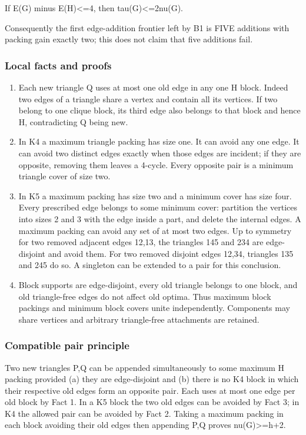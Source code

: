 \documentclass[11pt]{article}
\begin{document}
If \textbar E(G) minus E(H)\textbar\textless=4, then tau(G)\textless=2nu(G).

Consequently the first edge-addition frontier left by B1 is FIVE additions with packing gain exactly two; this does not claim that five additions fail.

\subsubsection{Local facts and proofs}\label{local-facts-and-proofs}

\begin{enumerate}
\def\labelenumi{\arabic{enumi}.}
\item
  Each new triangle Q uses at most one old edge in any one H block. Indeed two edges of a triangle share a vertex and contain all its vertices. If two belong to one clique block, its third edge also belongs to that block and hence H, contradicting Q being new.
\item
  In K4 a maximum triangle packing has size one. It can avoid any one edge. It can avoid two distinct edges exactly when those edges are incident; if they are opposite, removing them leaves a 4-cycle. Every opposite pair is a minimum triangle cover of size two.
\item
  In K5 a maximum packing has size two and a minimum cover has size four. Every prescribed edge belongs to some minimum cover: partition the vertices into sizes 2 and 3 with the edge inside a part, and delete the internal edges. A maximum packing can avoid any set of at most two edges. Up to symmetry for two removed adjacent edges 12,13, the triangles 145 and 234 are edge-disjoint and avoid them. For two removed disjoint edges 12,34, triangles 135 and 245 do so. A singleton can be extended to a pair for this conclusion.
\item
  Block supports are edge-disjoint, every old triangle belongs to one block, and old triangle-free edges do not affect old optima. Thus maximum block packings and minimum block covers unite independently. Components may share vertices and arbitrary triangle-free attachments are retained.
\end{enumerate}

\subsubsection{Compatible pair principle}\label{compatible-pair-principle}

Two new triangles P,Q can be appended simultaneously to some maximum H packing provided (a) they are edge-disjoint and (b) there is no K4 block in which their respective old edges form an opposite pair. Each uses at most one edge per old block by Fact 1. In a K5 block the two old edges can be avoided by Fact 3; in K4 the allowed pair can be avoided by Fact 2. Taking a maximum packing in each block avoiding their old edges then appending P,Q proves nu(G)\textgreater=h+2.
\end{document}
